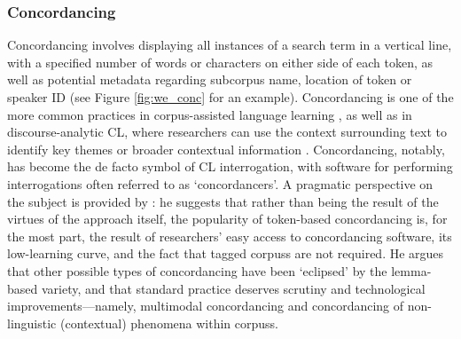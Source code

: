 \subsubsection{Concordancing} \label{sect:concordancing}

Concordancing involves displaying all instances of a search term in a vertical line, with a specified number of words or characters on either side of each token, as well as potential metadata regarding subcorpus name, location of token or speaker ID (see Figure \ref{fig:we_conc} for an example). Concordancing is one of the more common practices in corpus\hyp{}assisted language learning \cite{baldry_what_2008}, as well as in discourse\hyp{}analytic \gls{CL}, where researchers can use the context surrounding text to identify key themes or broader contextual information \cite{hardt-mautner_only_1995}. Concordancing, notably, has become the de facto symbol of \gls{CL} interrogation, with software for performing interrogations often referred to as `concordancers'. A pragmatic perspective on the subject is provided by \textcite{baldry_what_2008}: he suggests that rather than being the result of the virtues of the approach itself, the popularity of token\hyp{}based concordancing is, for the most part, the result of researchers' easy access to concordancing software, its low\hyp{}learning curve, and the fact that tagged \glspl{corpus} are not required. He argues that other possible types of concordancing have been `eclipsed' by the lemma\hyp{}based variety, and that standard practice deserves scrutiny and technological improvements---namely, multimodal concordancing and concordancing of non\hyp{}linguistic (contextual) phenomena within \glspl{corpus}.




